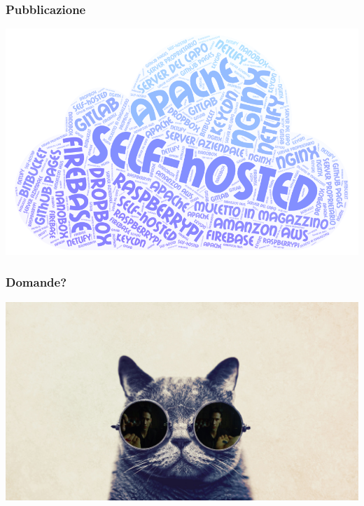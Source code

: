\begin{frame}
	\frametitle{Pubblicazione}
	\begin{center}
		\includegraphics[scale=0.32]{img/WordArt.png}
	\end{center}
\end{frame}

\begin{frame}
	\frametitle{Domande?}
	\begin{center}
		\includegraphics[scale=0.15]{img/cat-with-glasses}
	\end{center}
\end{frame}


